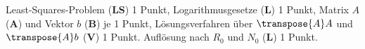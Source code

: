 \begin{bewertung}
Least-Squares-Problem ({\bf LS}) 1 Punkt,
Logarithmusgesetze ({\bf L}) 1 Punkt,
Matrix $A$ ({\bf A}) und Vektor $b$ ({\bf B}) je 1 Punkt,
Lösungsverfahren über $\transpose{A}A$ und $\transpose{A}b$ ({\bf V}) 1 Punkt.
Auflösung nach $R_0$ und $N_0$ ({\bf L}) 1 Punkt.
\end{bewertung}
